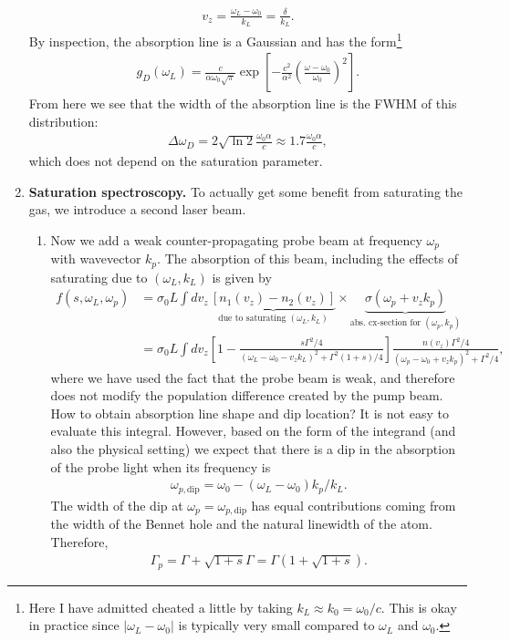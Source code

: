 \documentclass{article}
\theoremstyle{definition}
\newcommand{\al}{\alpha}
\newcommand{\f}[2]{\frac{#1}{#2}}
\newcommand{\lp}{\left(}
\newcommand{\rp}{\right)}
\newcommand{\lb}{\left[}
\newcommand{\rb}{\right]}
\begin{document}
\begin{enumerate}[label = (\alph*)]
	\begin{align*}
	v_z = \f{\omega_L - \omega_0}{k_L} = \f{\delta}{k_L}.
	\end{align*}
	By inspection, the absorption line is a Gaussian and has the form\footnote{Here I have admitted cheated a little by taking $k_L \approx k_0 = \omega_0/c$. This is okay in practice since $|\omega_L-\omega_0|$ is typically very small compared to $\omega_L$ and $\omega_0$. }
	\begin{align*}
	g_D(\omega_L) = \f{c}{\al \omega_0 \sqrt{\pi}} \exp\lb -\f{c^2}{\al^2}\lp \f{\omega - \omega_0}{\omega_0} \rp^2 \rb.
	\end{align*}
	From here we see that the width of the absorption line is the FWHM of this distribution:
	\begin{align*}
	\Delta \omega_D  = 2\sqrt{\ln 2} \f{\omega_0 \al}{c} \approx 1.7 \f{\omega_0 \al}{c},
	\end{align*}
	which does not depend on the saturation parameter. 
	
	
	\item \textbf{Saturation spectroscopy.} To actually get some benefit from saturating the gas, we introduce a second laser beam.
	\begin{enumerate}[label=(\roman*)]
		\item Now we add a weak counter-propagating probe beam at frequency $\omega_p$ with wavevector $k_p$. The absorption of this beam, including the effects of saturating due to $(\omega_L, k_L)$ is given by 
		\begin{align*}
		f(s,\omega_L, \omega_p) 
		&= \sigma_0 L \int dv_z\, \underbrace{[n_1(v_z) - n_2(v_z)]}_{\text{due to saturating $(\omega_L,k_L)$}} \times  \underbrace{\sigma(\omega_p + v_z k_p)}_{\text{abs. cx-section for $(\omega_p, k_p)$}}\\
		&= \sigma_0 L \int dv_z  \lb 1 - \f{s\Gamma^2/4}{(\omega_L - \omega_0 - v_z k_L)^2 + \Gamma^2(1+s)/4} \rb \f{n(v_z) \Gamma^2/4}{(\omega_p - \omega_0 + v_zk_p)^2 + \Gamma^2/4},
		\end{align*}
		where we have used the fact that the probe beam is weak, and therefore does not modify the population difference created by the pump beam.\\
		
		
		How to obtain absorption line shape and dip location? It is not easy to evaluate this integral. However, based on the form of the integrand (and also the physical setting) we expect that there is a dip in the absorption of the probe light when its frequency is 
		\begin{align*}
		\omega_{p,\text{dip}} = \omega_0 - (\omega_L - \omega_0) k_p/k_L.
		\end{align*}
		The width of the dip at $\omega_p = \omega_{p, \text{dip}}$ has equal contributions coming from the width of the Bennet hole and the natural linewidth of the atom. Therefore, 
		\begin{align*}
		\Gamma_p = \Gamma + \sqrt{1+s} \Gamma = \Gamma\lp 1+ \sqrt{1+s}\rp.
		\end{align*}
		

\end{enumerate}
\end{enumerate}
\end{document}
